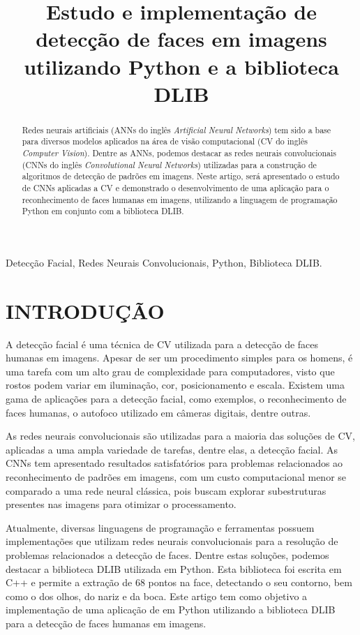 \documentclass[conference]{IEEEtran}
\title{Estudo e implementação de detecção de faces em imagens utilizando Python e a biblioteca DLIB}
\author{
    \IEEEauthorblockN{José B. M. Trineto \\ Werberson P. da Silva}
    \IEEEauthorblockA{
        \textit{Universidade de Brasília - Departamento de Engenharia Elétrica}
    }
}
\begin{document}
    \maketitle
    
    \begin{abstract}
        Redes neurais artificiais (ANNs do inglês \textit{Artificial Neural Networks}) tem sido a base para diversos modelos aplicados na área de visão computacional (CV do inglês \textit{Computer Vision}). Dentre as ANNs, podemos destacar as redes neurais convolucionais (CNNs do inglês \textit{Convolutional Neural Networks}) utilizadas para a construção de algoritmos de detecção de padrões em imagens. Neste artigo, será apresentado o estudo de CNNs aplicadas a CV e demonstrado o desenvolvimento de uma aplicação para o reconhecimento de faces humanas em imagens, utilizando a linguagem de programação Python em conjunto com a biblioteca DLIB. 
    \end{abstract}
    
    \begin{IEEEkeywords}
     	  Detecção Facial, Redes Neurais Convolucionais, Python, Biblioteca DLIB.
	 \end{IEEEkeywords}
	
    \section{INTRODUÇÃO}
		A detecção facial é uma técnica de CV utilizada para a detecção de faces humanas em imagens.	Apesar de ser um procedimento simples para os homens, é uma tarefa com um alto grau de complexidade para computadores, visto que rostos podem variar em iluminação, cor, posicionamento e escala. Existem uma gama de aplicações para a detecção facial, como exemplos, o reconhecimento de faces humanas, o autofoco utilizado em câmeras digitais, dentre outras.
		
	    As redes neurais convolucionais são utilizadas para a maioria das soluções de CV, aplicadas a uma ampla variedade de tarefas, dentre elas, a detecção facial. As CNNs tem apresentado resultados satisfatórios para problemas relacionados ao reconhecimento de padrões em imagens, com um custo computacional menor se comparado a uma rede neural clássica, pois buscam explorar subestruturas presentes nas imagens para otimizar o processamento.
	    
		Atualmente, diversas linguagens de programação e ferramentas possuem implementações que utilizam redes neurais convolucionais para a resolução de problemas relacionados a detecção de faces. Dentre estas soluções, podemos destacar a biblioteca DLIB utilizada em Python. Esta biblioteca foi escrita em C++ e permite a extração de 68 pontos na face, detectando o seu contorno, bem como o dos olhos, do nariz e da boca. Este artigo tem como objetivo a implementação de uma aplicação de em Python utilizando a biblioteca DLIB para a detecção de faces humanas em imagens.
		
\end{document}
